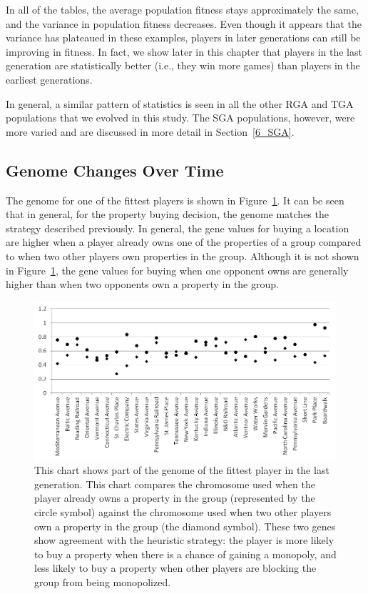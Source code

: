 In all of the tables, the average population fitness stays approximately
the same, and the variance in population fitness decreases. Even though it
appears that the variance has plateaued in these examples, players in later
generations can still be improving in fitness. In fact, we show later in this
chapter that players in the last generation are statistically better (i.e., they
win more games) than players in the earliest generations.

In general, a similar pattern of statistics is seen in all the other
RGA and TGA populations that we evolved in this study. The SGA populations,
however, were more varied and are discussed in more detail in
Section~\ref{6_SGA}.

\subsection{Genome Changes Over Time}

The genome for one of the fittest players is shown in
Figure~\ref{figure-genome}. It can be seen that in general, for the property
buying decision, the genome matches the strategy described previously. In
general, the gene values for buying a location are higher when a player already
owns one of the properties of a group compared to when two other players own
properties in the group. Although it is not shown in Figure~\ref{figure-genome},
the gene values for buying when one opponent owns are generally higher than when
two opponents own a property in the group.

\begin{figure}[htp]
\centerline{\includegraphics[width=0.75\columnwidth]{Figures/genome.png}}
\caption[Illustration of Genome]{This chart shows part of the genome of the
fittest player in the last generation. This chart compares the chromosome used
when the player already owns a property in the group (represented by the circle
symbol) against the chromosome used when two other players own a property in the
group (the diamond symbol). These two genes show agreement with the heuristic
strategy: the player is more likely to buy a property when there is a chance of
gaining a monopoly, and less likely to buy a property when other players are
blocking the group from being monopolized.}
\label{figure-genome}
\end{figure}


